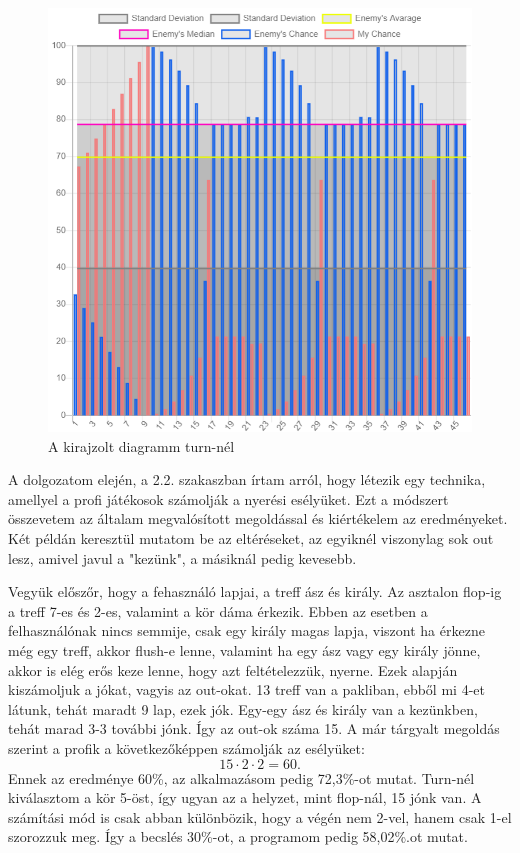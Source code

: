 \begin{figure}[h] 
	\centering
	\includegraphics[width=\textwidth]{images/chart-test.png}
	\caption{A kirajzolt diagramm turn-nél}
	\label{fig:chart-test}
\end{figure}


A dolgozatom elején, a 2.2. szakaszban írtam arról, hogy létezik egy technika, amellyel a profi játékosok számolják a nyerési esélyüket. Ezt a módszert összevetem az általam megvalósított megoldással és kiértékelem az eredményeket. Két példán keresztül mutatom be az eltéréseket, az egyiknél viszonylag sok out lesz, amivel javul a "kezünk", a másiknál pedig kevesebb.

Vegyük előszőr, hogy a fehasználó lapjai, a treff ász és király. Az asztalon flop-ig a treff 7-es és 2-es, valamint a kör dáma érkezik. Ebben az esetben a felhasználónak nincs semmije, csak egy király magas lapja, viszont ha érkezne még egy treff, akkor flush-e lenne, valamint ha egy ász vagy egy király jönne, akkor is elég erős keze lenne, hogy azt feltételezzük, nyerne. Ezek alapján kiszámoljuk a jókat, vagyis az out-okat. 13 treff van a pakliban, ebből mi 4-et látunk, tehát maradt 9 lap, ezek jók. Egy-egy ász és király van a kezünkben, tehát marad 3-3 további jónk. Így az out-ok száma 15. A már tárgyalt megoldás szerint a profik a következőképpen számolják az esélyüket: 
\[
15 \cdot 2 \cdot 2 = 60. 
\]
Ennek az eredménye 60\%, az alkalmazásom pedig 72,3\%-ot mutat. Turn-nél kiválasztom a kör 5-öst, így ugyan az a helyzet, mint flop-nál, 15 jónk van. A számítási mód is csak abban különbözik, hogy a végén nem 2-vel, hanem csak 1-el szorozzuk meg. Így a becslés 30\%-ot, a programom pedig 58,02\%.ot mutat.

